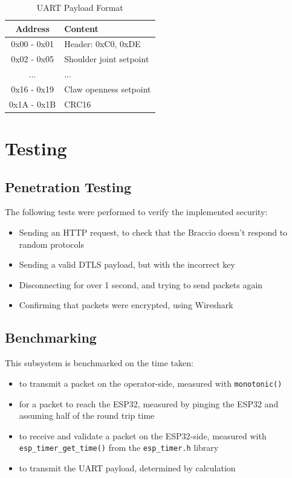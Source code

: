 \begin{table}[h!]
\centering
\caption{UART Payload Format}
\label{tab_net:uart_payload_format}
\small{
\begin{tabular}{|c|l|}
    \hline
    \textbf{Address} & \textbf{Content} \\
    \hline \hline
    0x00 - 0x01 & Header: 0xC0, 0xDE \\
    \hline
    0x02 - 0x05 & Shoulder joint setpoint \\
    \hline
    ... & ... \\
    \hline
    0x16 - 0x19 & Claw openness setpoint \\
    \hline
    0x1A - 0x1B & CRC16 \\
    \hline
\end{tabular}
}
\end{table}

\newpage
\section{Testing}\label{sec_net:testing}
\subsection{Penetration Testing}
The following tests were performed to verify the implemented security:
\begin{itemize}[nosep]
    \item Sending an HTTP request, to check that the Braccio doesn't respond to random protocols
    \item Sending a valid DTLS payload, but with the incorrect key
    \item Disconnecting for over 1 second, and trying to send packets again
    \item Confirming that packets were encrypted, using Wireshark
\end{itemize}

\subsection{Benchmarking}
This subsystem is benchmarked on the time taken:
\begin{itemize}[nosep]
    \item to transmit a packet on the operator-side, measured with \verb|monotonic()|
    \item for a packet to reach the ESP32, measured by pinging the ESP32 and assuming half of the round trip time
    \item to receive and validate a packet on the ESP32-side, measured with \verb|esp_timer_get_time()| from the \verb|esp_timer.h| library
    \item to transmit the UART payload, determined by calculation
\end{itemize}

